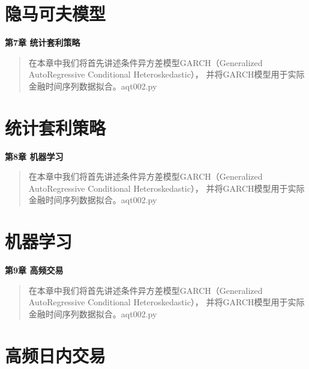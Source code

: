 \documentclass{article}
\begin{document}
\section{隐马可夫模型}

\maketitle\begin{center}
\Large \textbf{第7章 统计套利策略}
\end{center}
\begin{abstract}
在本章中我们将首先讲述条件异方差模型GARCH（Generalized AutoRegressive Conditional Heteroskedastic），
并将GARCH模型用于实际金融时间序列数据拟合。aqt002.py
\end{abstract}
\section{统计套利策略}

\maketitle\begin{center}
\Large \textbf{第8章 机器学习}
\end{center}
\begin{abstract}
在本章中我们将首先讲述条件异方差模型GARCH（Generalized AutoRegressive Conditional Heteroskedastic），
并将GARCH模型用于实际金融时间序列数据拟合。aqt002.py
\end{abstract}
\section{机器学习}

\maketitle\begin{center}
\Large \textbf{第9章 高频交易}
\end{center}
\begin{abstract}
在本章中我们将首先讲述条件异方差模型GARCH（Generalized AutoRegressive Conditional Heteroskedastic），
并将GARCH模型用于实际金融时间序列数据拟合。aqt002.py
\end{abstract}
\section{高频日内交易}
\end{document}
